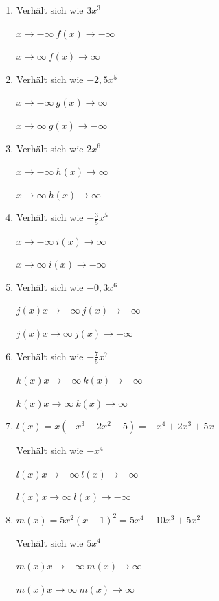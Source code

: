 \begin{Answer}[ref=ganzVerA1]

	\begin{minipage}{\textwidth}
		\begin{minipage}[t]{0.5\textwidth}
			\begin{enumerate}[label=\alph*)]
				\item Verhält sich wie \(3x^3\)

				\(x\rightarrow -\infty\ f(x)\rightarrow -\infty\)

				\(x\rightarrow \infty\ f(x)\rightarrow \infty\)
				\item Verhält sich wie \(-2,5x^5\)

				\(x\rightarrow -\infty\ g(x)\rightarrow \infty\)

				\(x\rightarrow \infty\ g(x)\rightarrow -\infty\)
				\item Verhält sich wie \(2x^6\)

				\(x\rightarrow -\infty\ h(x)\rightarrow \infty\)

				\(x\rightarrow \infty\ h(x)\rightarrow \infty\)
				\item Verhält sich wie \(-\frac{3}{5}x^5\)

				\(x\rightarrow -\infty\ i(x)\rightarrow \infty\)

				\(x\rightarrow \infty\ i(x)\rightarrow -\infty\)
			\end{enumerate}
		\end{minipage}%
		\begin{minipage}[t]{0.5\textwidth}
			\begin{enumerate}[label=\alph*)]
				\setcounter{enumi}{4}
				\item Verhält sich wie \(-0,3x^6\)

				\(j(x)x\rightarrow -\infty\ j(x)\rightarrow -\infty\)

				\(j(x)x\rightarrow \infty\ j(x)\rightarrow -\infty\)
				\item Verhält sich wie \(-\frac{7}{5}x^7\)

				\(k(x)x\rightarrow -\infty\ k(x)\rightarrow -\infty\)

				\(k(x)x\rightarrow \infty\ k(x)\rightarrow \infty\)
				\item \(l(x)=x\left(-x^3+2x^2+5\right)=-x^4+2x^3+5x\)

				Verhält sich wie \(-x^4\)

				\(l(x)x\rightarrow -\infty\ l(x)\rightarrow -\infty\)

				\(l(x)x\rightarrow \infty\ l(x)\rightarrow -\infty\)
				\item \(m(x)=5x^2\left(x-1\right)^2=5x^4-10x^3+5x^2\)

				Verhält sich wie \(5x^4\)

				\(m(x)x\rightarrow -\infty\ m(x)\rightarrow \infty\)

				\(m(x)x\rightarrow \infty\ m(x)\rightarrow \infty\)
			\end{enumerate}
		\end{minipage}%
	\end{minipage}
\end{Answer}